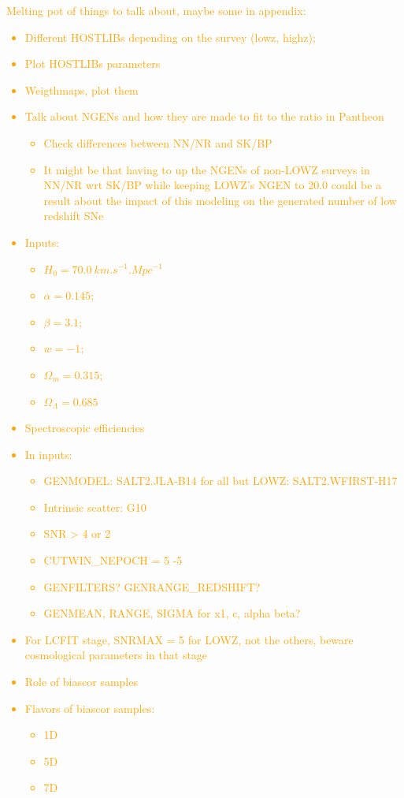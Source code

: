 \documentclass[]{aa}
\newcommand{\NN}[1]{\textcolor{orange}{#1}}
\begin{document}
\NN{Melting pot of things to talk about, maybe some in appendix:
\begin{itemize}
    \item Different HOSTLIBs depending on the survey (lowz, highz);
    \item Plot HOSTLIBs parameters
    \item Weigthmaps, plot them
    \item Talk about NGENs and how they are made to fit to the ratio in Pantheon
        \begin{itemize}
            \item Check differences between NN/NR and SK/BP
            \item It might be that having to up the NGENs of non-LOWZ surveys in
                NN/NR wrt SK/BP while keeping LOWZ's NGEN to 20.0 could be a
                result about the impact of this modeling on the generated number
                of low redshift SNe
        \end{itemize}
    \item Inputs:
        \begin{itemize}
            \item $H_0 = \SI{70.0}{km.s^{-1}.Mpc^{-1}}$
            \item $\alpha = 0.145$;
            \item $\beta = 3.1$;
            \item $w = -1$;
            \item $\Omega_m = 0.315$;
            \item $\Omega_\Lambda = 0.685$
        \end{itemize}
    \item Spectroscopic efficiencies
    \item In inputs:
        \begin{itemize}
            \item GENMODEL: SALT2.JLA-B14 for all but LOWZ: SALT2.WFIRST-H17
            \item Intrinsic scatter: G10
            \item SNR > 4 or 2
            \item CUTWIN\_NEPOCH = 5 -5
            \item GENFILTERS? GENRANGE\_REDSHIFT?
            \item GENMEAN, RANGE, SIGMA for x1, c, alpha beta?
        \end{itemize}
    \item For LCFIT stage, SNRMAX = 5 for LOWZ, not the others, beware
        cosmological parameters in that stage
    \item Role of biascor samples
    \item Flavors of biascor samples:
        \begin{itemize}
            \item 1D
            \item 5D
            \item 7D
        \end{itemize}
\end{itemize}}
\end{document}
